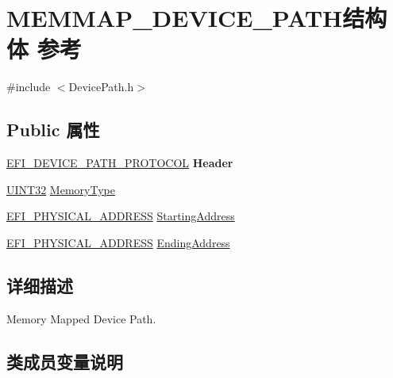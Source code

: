 \hypertarget{struct_m_e_m_m_a_p___d_e_v_i_c_e___p_a_t_h}{}\section{M\+E\+M\+M\+A\+P\+\_\+\+D\+E\+V\+I\+C\+E\+\_\+\+P\+A\+T\+H结构体 参考}
\label{struct_m_e_m_m_a_p___d_e_v_i_c_e___p_a_t_h}


{\ttfamily \#include $<$Device\+Path.\+h$>$}

\subsection*{Public 属性}
\begin{DoxyCompactItemize}
\item 
\mbox{\label{struct_m_e_m_m_a_p___d_e_v_i_c_e___p_a_t_h_a258e2a4536250e86b6bba382cfdb9160}} 
\hyperlink{struct_e_f_i___d_e_v_i_c_e___p_a_t_h___p_r_o_t_o_c_o_l}{E\+F\+I\+\_\+\+D\+E\+V\+I\+C\+E\+\_\+\+P\+A\+T\+H\+\_\+\+P\+R\+O\+T\+O\+C\+OL} {\bfseries Header}
\item 
\hyperlink{_processor_bind_8h_ae1e6edbbc26d6fbc71a90190d0266018}{U\+I\+N\+T32} \hyperlink{struct_m_e_m_m_a_p___d_e_v_i_c_e___p_a_t_h_a38bbd0ee43b1ae2127ca524c7b09c07c}{Memory\+Type}
\item 
\hyperlink{_uefi_base_type_8h_a31bc7e7faeab8d2940ee34f21d41cd04}{E\+F\+I\+\_\+\+P\+H\+Y\+S\+I\+C\+A\+L\+\_\+\+A\+D\+D\+R\+E\+SS} \hyperlink{struct_m_e_m_m_a_p___d_e_v_i_c_e___p_a_t_h_a099cb083fb521380e6451de7a28b768d}{Starting\+Address}
\item 
\hyperlink{_uefi_base_type_8h_a31bc7e7faeab8d2940ee34f21d41cd04}{E\+F\+I\+\_\+\+P\+H\+Y\+S\+I\+C\+A\+L\+\_\+\+A\+D\+D\+R\+E\+SS} \hyperlink{struct_m_e_m_m_a_p___d_e_v_i_c_e___p_a_t_h_a40c5443abc0ca32e8e31d7ca896321e6}{Ending\+Address}
\end{DoxyCompactItemize}


\subsection{详细描述}
Memory Mapped Device Path. 

\subsection{类成员变量说明}
\mbox{\label{struct_m_e_m_m_a_p___d_e_v_i_c_e___p_a_t_h_a40c5443abc0ca32e8e31d7ca896321e6}} 
